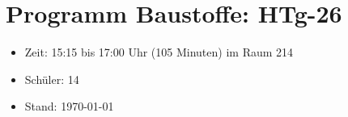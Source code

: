 \documentclass[
11pt,
captions=tableheading,
headings=big,
headsepline,
footsepline, 
captions=tableheading,
parskip=half-,
]{scrartcl}
\title{\fach}
\date{2024}
\newcommand{\klasse}{HTg-26\xspace}
\begin{document}
\section*{Programm Baustoffe: \klasse}
\begin{itemize}
    \item Zeit: 15:15 bis 17:00 Uhr (105 Minuten) im Raum 214
    \item Schüler: 14
    \item Stand: \today
\end{itemize}








\vspace{1cm}

\setcounter{lecture}{0}
\newcommand{\nr}{\stepcounter{lecture}\thelecture} %
\end{document}
